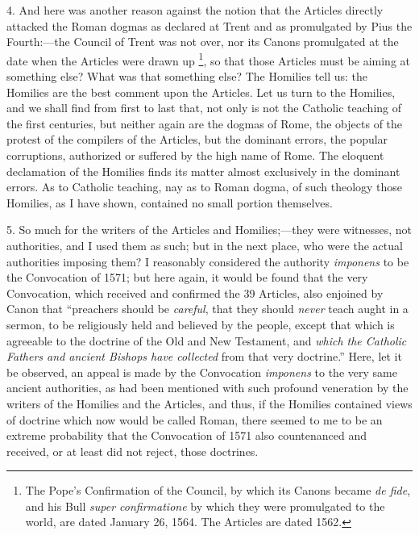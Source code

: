 4. And here was another reason against the notion that the Articles
directly attacked the Roman dogmas as declared at Trent and as
promulgated by Pius the Fourth:—the Council of Trent was not over, nor
its Canons promulgated at the date when the Articles were
drawn up \footnote{The
Pope's Confirmation of the Council, by which its Canons became \emph{de
fide}, and his Bull \emph{super confirmatione} by which they were
promulgated to the world, are dated January 26, 1564. The Articles are
dated 1562.}, so that those Articles
must be aiming at something else? What was that something
else? The Homilies tell us: the Homilies are the best comment upon the
Articles. Let us turn to the Homilies, and we shall find from first to
last that, not only is not the Catholic teaching of the first centuries,
but neither again are the dogmas of Rome, the objects of the protest of
the compilers of the Articles, but the dominant errors, the popular
corruptions, authorized or suffered by the high name of Rome. The
eloquent declamation of the Homilies finds its matter almost exclusively
in the dominant errors. As to Catholic teaching, nay as to Roman
dogma, of such theology those Homilies, as I have shown,
contained no small portion themselves.

5. So much for the writers of the Articles and Homilies;—they were
witnesses, not authorities, and I used them as such; but in the next
place, who were the actual authorities imposing them? I reasonably considered the
authority \emph{imponens} to
be the Convocation of 1571; but here again, it would be found that the
very Convocation, which received and confirmed the 39 Articles, also
enjoined by Canon that ``preachers should be \emph{careful}, that
they should \emph{never} teach aught in a sermon, to be religiously held
and believed by the people, except that which is agreeable to the
doctrine of the Old and New Testament, and \emph{which the Catholic Fathers
and ancient Bishops have collected} from that very doctrine.''
Here, let it be observed, an appeal is made by the Convocation \emph{imponens}
to the very same ancient authorities, as had been mentioned with such
profound veneration by the writers of the Homilies and the
Articles, and thus, if the Homilies contained views of doctrine which
now would be called Roman, there seemed to me to be an extreme
probability that the Convocation of 1571 also countenanced and received,
or at least did not reject, those doctrines.

